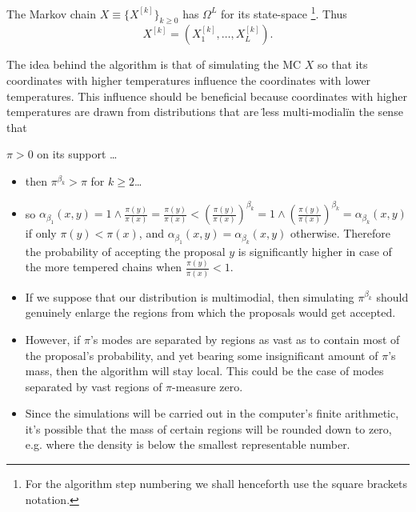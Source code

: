 The Markov chain $X \equiv \{ X^{[k]}\}_{k \geq 0}$ has $\Omega^L$ for its state-space \footnote{For the algorithm step numbering we shall henceforth use the square brackets notation.}. Thus $$X^{[k]} = (X_1^{[k]}, \dots, X_L^{[k]}).$$

The idea behind the algorithm is that of simulating the MC $X$ so that its coordinates with higher temperatures influence the coordinates with lower temperatures. This influence should be beneficial because coordinates with higher temperatures are drawn from distributions that are \"less multi-modial\" in the sense that

\begin{assumptions}[resume]
	\item $\pi > 0$ on its support \dots
\end{assumptions}
	

\begin{itemize}	
	\item then $\pi^{\beta_k} > \pi$ for $k \geq 2$\dots
	\item so $\alpha_{\beta_1}(x,y) = 1 \wedge \frac{\pi(y)}{\pi(x)} = \frac{\pi(y)}{\pi(x)} <  (\frac{\pi(y)}{\pi(x)})^{\beta_k} = 1 \wedge (\frac{\pi(y)}{\pi(x)})^{\beta_k} = \alpha_{\beta_k}(x,y)$ if only $\pi(y) < \pi(x)$, and $\alpha_{\beta_1}(x,y) = \alpha_{\beta_k}(x,y)$ otherwise. Therefore the probability of accepting the proposal $y$ is significantly higher in case of the more tempered chains when $\frac{\pi(y)}{\pi(x)} < 1$.
	\item If we suppose that our distribution is multimodial, then simulating $\pi^{\beta_k}$ should genuinely enlarge the regions from which the proposals would get accepted. 
	\item However, if $\pi$'s modes are separated by regions as vast as to contain most of the proposal's probability, and yet bearing some insignificant amount of $\pi$'s mass, then the algorithm will stay local. This could be the case of modes separated by vast regions of $\pi$-measure zero. 
	\item Since the simulations will be carried out in the computer's finite arithmetic, it's possible that the mass of certain regions will be rounded down to zero, e.g. where the density is below the smallest representable number.  
\end{itemize}  

